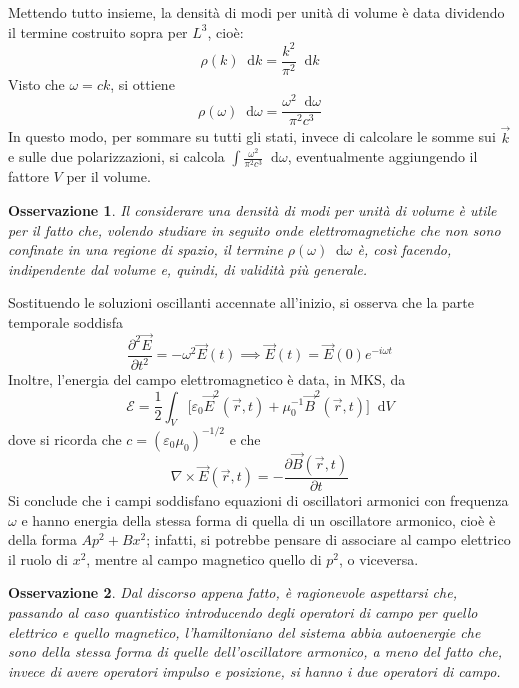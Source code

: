 \documentclass[11pt, a4paper]{scrartcl}
\theoremstyle{style}
\newtheorem{osservazione}{Osservazione}[section]
\newcommand{\dd}{\mathop{}\!\mathrm{d}}
\numberwithin{equation}{subsection}
\begin{document}
Mettendo tutto insieme, la densit\`a di modi per unit\`a di volume \`e data dividendo il termine costruito sopra per $L^3$, cio\`e:
\begin{equation*}
	\rho (k)\dd k= \frac{ k^2 }{\pi^2}\dd k
\end{equation*}
Visto che $\omega = ck$, si ottiene 
\begin{equation}
	\rho (\omega ) \dd \omega = \frac{\omega ^2 \dd \omega}{\pi ^2 c^3}
\end{equation}
In questo modo, per sommare su tutti gli stati, invece di calcolare le somme sui $\vec{k}$ e sulle due polarizzazioni, si calcola $\int \frac{\omega^2}{ \pi^2 c^3} \dd \omega$, eventualmente aggiungendo il fattore $V$ per il volume.
\begin{osservazione}
Il considerare una densit\`a di modi per unit\`a di volume \`e utile per il fatto che, volendo studiare in seguito onde elettromagnetiche che non sono confinate in una regione di spazio, il termine $\rho (\omega ) \dd \omega$ \`e, cos\`i facendo, indipendente dal volume e, quindi, di validit\`a pi\`u generale.
\end{osservazione}

\noindent Sostituendo le soluzioni oscillanti accennate all'inizio, si osserva che la parte temporale soddisfa 
\[
\frac{\partial ^2 \vec{E}}{\partial t^2}  = - \omega ^ 2 \vec{E}(t) \implies \vec{E}(t) = \vec{E}(0) e^{-i\omega t}
\] 
Inoltre, l'energia del campo elettromagnetico \`e data, in MKS, da 
\begin{equation}
	\mathcal{E}  = \frac{1}{2} \int _V \Big[\varepsilon _0 \vec{E}^2(\vec{r},t) + \mu _0 ^{-1} \vec{B}^2 (\vec{r},t)\Big] \dd V
\end{equation}
dove si ricorda che $c = (\varepsilon _0 \mu _0)^{-1 / 2}$ e che
\[
	\nabla \times \vec{E}(\vec{r},t) = - \frac{\partial \vec{B}(\vec{r},t)}{\partial t} 
\] 
Si conclude che i campi soddisfano equazioni di oscillatori armonici con frequenza $\omega $ e hanno energia della stessa forma di quella di un oscillatore armonico, cio\`e \`e della forma $A p^2 + Bx^2$; infatti, si potrebbe pensare di associare al campo elettrico il ruolo di $x^2$, mentre al campo magnetico quello di $p^2$, o viceversa.
\begin{osservazione}
Dal discorso appena fatto, \`e ragionevole aspettarsi che, passando al caso quantistico introducendo degli operatori di campo per quello elettrico e quello magnetico, l'hamiltoniano del sistema abbia autoenergie che sono della stessa forma di quelle dell'oscillatore armonico, a meno del fatto che, invece di avere operatori impulso e posizione, si hanno i due operatori di campo.
\end{osservazione}
\end{document}
